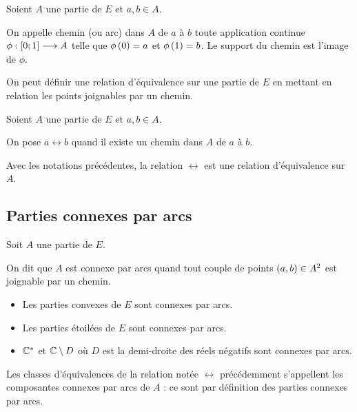 \begin{defi}
Soient \(A\) une partie de \(E\) et \(a,b\in A\).

On appelle chemin (ou arc) dans \(A\) de \(a\) à \(b\) toute application continue \(\phi:\left[0;1\right]\longrightarrow A\) telle que \(\phi\left(0\right)=a\) et \(\phi\left(1\right)=b\). Le support du chemin est l'image de \(\phi\).
\end{defi}

On peut définir une relation d'équivalence sur une partie de \(E\) en mettant en relation les points joignables par un chemin.

\begin{defi}
Soient \(A\) une partie de \(E\) et \(a,b\in A\).

On pose \(a\rel b\) quand il existe un chemin dans \(A\) de \(a\) à \(b\).
\end{defi}

\begin{prop}
Avec les notations précédentes, la relation \(\rel\) est une relation d'équivalence sur \(A\).
\end{prop}

\subsection{Parties connexes par arcs}

\begin{defi}
Soit \(A\) une partie de \(E\).

On dit que \(A\) est connexe par arcs quand tout couple de points \(\left(a,b\right)\in A^2\) est joignable par un chemin.
\end{defi}

\begin{ex}
\begin{itemize}
    \item Les parties convexes de \(E\) sont connexes par arcs. \\
    \item Les parties étoilées de \(E\) sont connexes par arcs. \\
    \item \(\mathbb{C}^*\) et \(\mathbb{C}\setminus D\) où \(D\) est la demi-droite des réels négatifs sont connexes par arcs.
\end{itemize}
\end{ex}

Les classes d'équivalences de la relation notée \(\rel\) précédemment s'appellent les composantes connexes par arcs de \(A\) : ce sont par définition des parties connexes par arcs.


